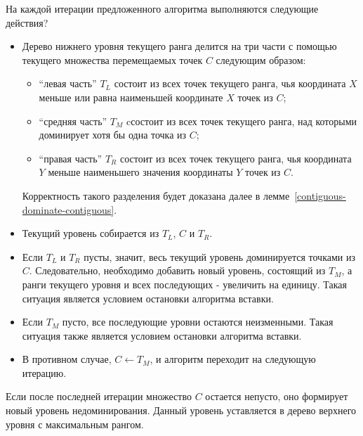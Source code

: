 На каждой итерации предложенного алгоритма выполняются следующие действия?
\begin{itemize}
    \item Дерево нижнего уровня текущего ранга делится на три части с помощью
          текущего множества перемещаемых точек $C$ следующим образом:
    \begin{itemize}
        \item ``левая часть'' $T_L$ состоит из всех точек текущего ранга, чья координата
              $X$ меньше или равна наименьшей координате $X$ точек из $C$;
        \item ``средняя часть'' $T_M$ cсостоит из всех точек текущего ранга,
              над которыми доминирует хотя бы одна точка из $C$;
        \item ``правая часть'' $T_R$ состоит из всех точек текущего ранга,
              чья координата $Y$ меньше наименьшего значения координаты $Y$ точек из $C$.
    \end{itemize}
    Корректность такого разделения будет доказана далее в лемме~\ref{contiguous-dominate-contiguous}.
    \item Текущий уровень собирается из $T_L$, $C$ и $T_R$.
    \item Если $T_L$ и $T_R$ пусты, значит, весь текущий уровень доминируется точками из $C$.
          Следовательно, необходимо добавить новый уровень, состоящий из $T_M$, а ранги 
          текущего уровня и всех последующих - увеличить на единицу.
          Такая ситуация является условием остановки алгоритма вставки.
    \item Если $T_M$ пусто, все последующие уровни остаются неизменными.
          Такая ситуация также является условием остановки алгоритма вставки.
    \item В противном случае, $C \gets T_M$, и алгоритм переходит на следующую итерацию.
\end{itemize}
Если после последней итерации множество $C$ остается непусто, оно формирует новый уровень недоминирования.
Данный уровень уставляется в дерево верхнего уровня с максимальным рангом.

